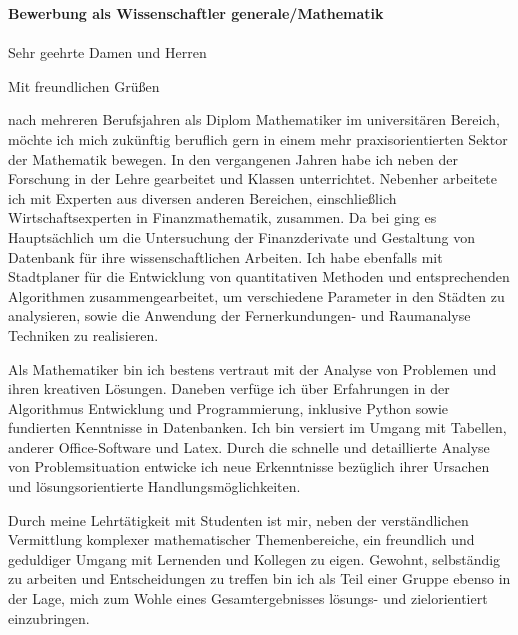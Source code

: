 \documentclass[11pt,a4paper,sans]{moderncv}        %
\title{}                               %
\begin{document}
\recipient{-----}{-----\\--------
\\---------}
\date{Dezember 09, 2015}
\opening{\textbf{Bewerbung als Wissenschaftler generale/Mathematik}\\ ~~ \\ Sehr geehrte Damen und Herren}
\closing{Mit freundlichen Grüßen}
\enclosure[Anhang]{}          %
\makelettertitle
nach mehreren Berufsjahren als Diplom Mathematiker im universitären Bereich, möchte ich mich zukünftig beruflich gern in einem mehr praxisorientierten Sektor der Mathematik  bewegen. In den vergangenen Jahren habe ich neben der Forschung in der Lehre gearbeitet und  Klassen unterrichtet. Nebenher arbeitete ich mit Experten aus diversen anderen Bereichen, einschließlich  Wirtschaftsexperten in Finanzmathematik, zusammen. Da bei ging es Hauptsächlich um die Untersuchung der Finanzderivate  und Gestaltung von Datenbank für ihre wissenschaftlichen Arbeiten. Ich habe ebenfalls mit Stadtplaner für die Entwicklung von quantitativen Methoden und entsprechenden Algorithmen zusammengearbeitet, um verschiedene Parameter in den Städten zu analysieren, sowie die Anwendung der Fernerkundungen- und Raumanalyse Techniken zu realisieren.

Als Mathematiker bin ich bestens vertraut mit der  Analyse von Problemen und ihren kreativen Lösungen. Daneben verfüge ich über Erfahrungen in der Algorithmus Entwicklung und Programmierung, inklusive Python sowie fundierten  Kenntnisse in Datenbanken. Ich bin versiert im Umgang mit Tabellen, anderer Office-Software und  Latex. Durch die schnelle und detaillierte Analyse von Problemsituation entwicke ich neue Erkenntnisse bezüglich ihrer Ursachen und lösungsorientierte Handlungsmöglichkeiten. 

Durch meine Lehrtätigkeit mit Studenten ist mir, neben der verständlichen Vermittlung komplexer mathematischer Themenbereiche, ein freundlich und geduldiger Umgang mit Lernenden und Kollegen zu eigen.  
 Gewohnt, selbständig zu arbeiten und Entscheidungen zu treffen bin ich als  Teil einer Gruppe ebenso in der Lage, mich zum Wohle eines Gesamtergebnisses lösungs- und zielorientiert einzubringen.
\end{document}
